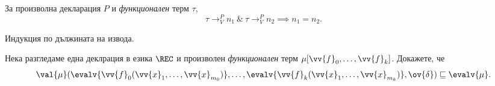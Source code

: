 \begin{problem}
  За произволна декларация $P$ и {\em функционален} терм $\tau$,
  \[\tau \to^P_V n_1\ \&\ \tau \to^P_V n_2 \implies n_1 = n_2.\]
\end{problem}
\begin{hint}
  Индукция по дължината на извода.
\end{hint}

\begin{problem}
  \label{pr:equiv-value1}
  Нека разгледаме една деклрация  в езика $\REC$ и произволен {\em функционален} терм $\mu[\vv{f}_0,\dots,\vv{f}_k]$.
  Докажете, че 
  \[\val{\mu}(\evalv{\vv{f}_0(\vv{x}_1,\dots,\vv{x}_{m_0})},\dots,\evalv{\vv{f}_k(\vv{x}_1,\dots,\vv{x}_{m_k})}, \ov{\delta}) \sqsubseteq \evalv{\mu}.\]
\end{problem}
    
